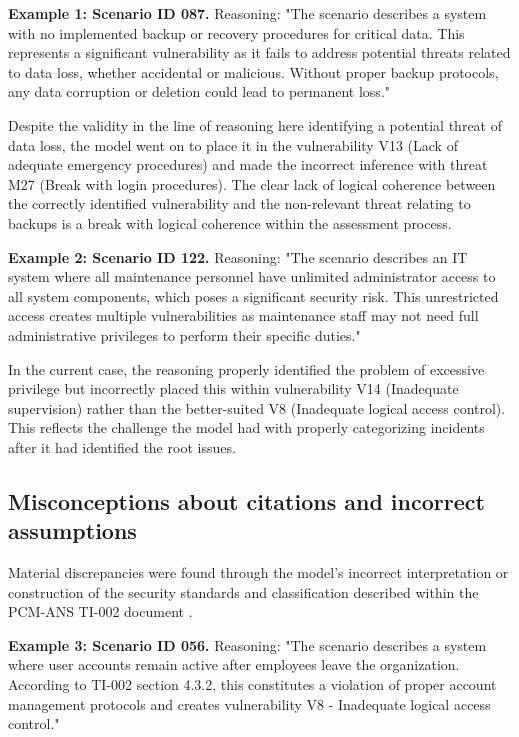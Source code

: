 \documentclass[sigconf]{acmart}
\begin{document}
\textbf{Example 1: Scenario ID 087.} Reasoning: "The scenario describes a system with no implemented backup or recovery procedures for critical data. This represents a significant vulnerability as it fails to address potential threats related to data loss, whether accidental or malicious. Without proper backup protocols, any data corruption or deletion could lead to permanent loss."

Despite the validity in the line of reasoning here identifying a potential threat of data loss, the model went on to place it in the vulnerability V13 (Lack of adequate emergency procedures) and made the incorrect inference with threat M27 (Break with login procedures). The clear lack of logical coherence between the correctly identified vulnerability and the non-relevant threat relating to backups is a break with logical coherence within the assessment process.

\textbf{Example 2: Scenario ID 122.} Reasoning: "The scenario describes an IT system where all maintenance personnel have unlimited administrator access to all system components, which poses a significant security risk. This unrestricted access creates multiple vulnerabilities as maintenance staff may not need full administrative privileges to perform their specific duties."

In the current case, the reasoning properly identified the problem of excessive privilege but incorrectly placed this within vulnerability V14 (Inadequate supervision) rather than the better-suited V8 (Inadequate logical access control). This reflects the challenge the model had with properly categorizing incidents after it had identified the root issues.

\subsection{Misconceptions about citations and incorrect assumptions}
Material discrepancies were found through the model's incorrect interpretation or construction of the security standards and classification described within the PCM-ANS TI-002 document \citep{NationalSecurity1995}.

\textbf{Example 3: Scenario ID 056.} Reasoning: "The scenario describes a system where user accounts remain active after employees leave the organization. According to TI-002 section 4.3.2, this constitutes a violation of proper account management protocols and creates vulnerability V8 - Inadequate logical access control."
\end{document}
